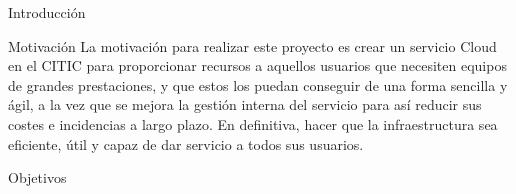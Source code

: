 \begin{chapter}{Introducción}





\begin{section}{Motivación}
La motivación para realizar este proyecto es crear un servicio Cloud en el CITIC para proporcionar recursos a aquellos usuarios que necesiten equipos de grandes prestaciones, y que estos los puedan conseguir de una forma sencilla y ágil, a la vez que se mejora la gestión interna del servicio para así reducir sus costes e incidencias a largo plazo. En definitiva, hacer que la infraestructura sea eficiente, útil y capaz de dar servicio a todos sus usuarios.
\end{section}
\begin{section}{Objetivos}


\end{section}
\end{chapter}
